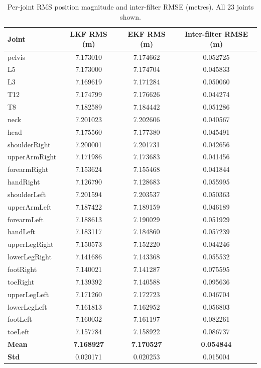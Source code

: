 \documentclass[12pt, a4paper]{article}
\begin{document}
\begin{table}[H]
\centering
\caption{Per-joint RMS position magnitude and inter-filter RMSE (metres). All 23 joints shown.}
\label{tab:rmse}
\small
\begin{tabular}{lccc}
\toprule
\textbf{Joint} & \textbf{LKF RMS (m)} & \textbf{EKF RMS (m)} & \textbf{Inter-filter RMSE (m)} \\
\midrule
pelvis          & 7.173010 & 7.174662 & 0.052725 \\
L5              & 7.173000 & 7.174704 & 0.045833 \\
L3              & 7.169619 & 7.171284 & 0.050060 \\
T12             & 7.174799 & 7.176626 & 0.044274 \\
T8              & 7.182589 & 7.184442 & 0.051286 \\
neck            & 7.201023 & 7.202606 & 0.040567 \\
head            & 7.175560 & 7.177380 & 0.045491 \\
shoulderRight   & 7.200001 & 7.201731 & 0.042656 \\
upperArmRight   & 7.171986 & 7.173683 & 0.041456 \\
forearmRight    & 7.153624 & 7.155468 & 0.041844 \\
handRight       & 7.126790 & 7.128683 & 0.055995 \\
shoulderLeft    & 7.201594 & 7.203537 & 0.050363 \\
upperArmLeft    & 7.187422 & 7.189159 & 0.046189 \\
forearmLeft     & 7.188613 & 7.190029 & 0.051929 \\
handLeft        & 7.183117 & 7.184860 & 0.057239 \\
upperLegRight   & 7.150573 & 7.152220 & 0.044246 \\
lowerLegRight   & 7.141686 & 7.143368 & 0.055532 \\
footRight       & 7.140021 & 7.141287 & 0.075595 \\
toeRight        & 7.139392 & 7.140588 & 0.095636 \\
upperLegLeft    & 7.171260 & 7.172723 & 0.046704 \\
lowerLegLeft    & 7.161813 & 7.162952 & 0.056803 \\
footLeft        & 7.160032 & 7.161197 & 0.082261 \\
toeLeft         & 7.157784 & 7.158922 & 0.086737 \\
\midrule
\textbf{Mean}   & \textbf{7.168927} & \textbf{7.170527} & \textbf{0.054844} \\
\textbf{Std}    & 0.020171 & 0.020253 & 0.015004 \\
\bottomrule
\end{tabular}
\end{table}
\end{document}

